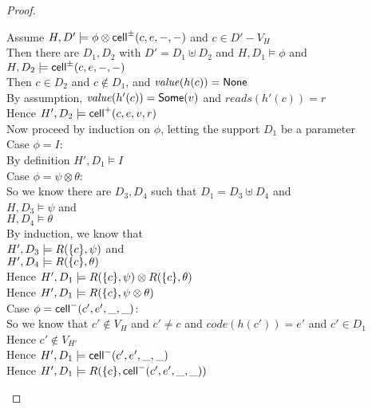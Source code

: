 \begin{proof}
  \begin{tabbedproof}
    \oo Assume $H, D' \models \phi \otimes \mathsf{cell}^{\pm}({c}, {e}, {-}, {-})$ and $c \in D' - V_H$ \\
    \ooo Then there are $D_1, D_2$ with $D' = D_1 \uplus D_2$ and $H, D_1 \models \phi$ and $H, D_2 \models \mathsf{cell}^{\pm}({c}, {e}, {-}, {-})$ \\
    \ooo Then $c \in D_2$ and $c \not \in D_1$, and $\mathit{value}(h(c)) = \mathsf{None}$ \\
    \ooo By assumption, $\mathit{value}(h'(c)) = \mathsf{Some}(v)$ and $\mathit{reads}(h'(c)) = r$ \\
    \ooo Hence $H', D_2 \models \mathsf{cell}^{+}({c}, {e}, {v}, {r})$ \\
    \ooo Now proceed by induction on $\phi$, letting the support $D_1$ be a parameter \\
    \ooo Case $\phi = I$: \\
    \oooo By definition $H', D_1 \models I$ \\
    \ooo Case $\phi = \psi \otimes \theta$: \\
    \oooo So we know there are $D_3, D_4$ such that $D_1 = D_3 \uplus D_4$ and \\
    \oooox $H, D_3 \models \psi$ and \\
    \oooox $H, D_4 \models \theta$ \\
    \oooo By induction, we know that \\
    \oooox $H', D_3 \models R(\{{c}\}, \psi)$ and \\
    \oooox $H', D_4 \models R(\{{c}\}, \theta)$ \\
    \oooo Hence $H', D_1 \models R(\{{c}\}, \psi) \otimes R(\{{c}\}, \theta)$ \\
    \oooo Hence $H', D_1 \models R(\{{c}\}, \psi \otimes \theta)$ \\

    \ooo Case $\phi = \mathsf{cell}^{-}({c'}, {e'}, {\_}, {\_})$: \\
    \oooo So we know that $c' \not\in V_H$ and $c' \not= c$ and $\mathit{code}(h(c')) = e'$ and $c' \in D_1$\\
    \oooo Hence $c' \not\in V_{H'}$ \\
    \oooo Hence $H', D_1 \models \mathsf{cell}^{-}({c'}, {e'}, {\_}, {\_})$ \\
    \oooo Hence $H', D_1 \models R(\{{c}\}, \mathsf{cell}^{-}({c'}, {e'}, {\_}, {\_}))$ \\


\end{tabbedproof}
\end{proof}
